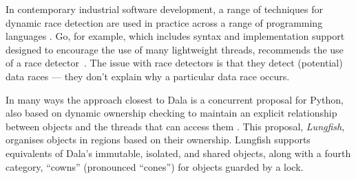 

In contemporary industrial software development, a range of techniques
for dynamic race detection are used in practice across a range of
programming languages
\cite{hong2015survey}.  Go, for
example, which includes syntax and implementation support designed to
encourage the use of many lightweight threads, recommends the use
of a race detector~\cite{GoCACM2022}.
The issue with race detectors is that they detect (potential)
data races --- they don't explain why a particular data race
occurs.



In many ways the approach closest to Dala is a concurrent proposal for Python, also based on
dynamic ownership checking to maintain an explicit relationship
between objects and the threads that can access them
\cite{pyrona2025}. This proposal, \textit{Lungfish}, organises objects
in regions based on their ownership. Lungfish supports equivalents of
Dala's immutable, isolated, and shared objects, along with a fourth
category, ``cowns'' (pronounced ``cones'') for objects guarded by a
lock.


